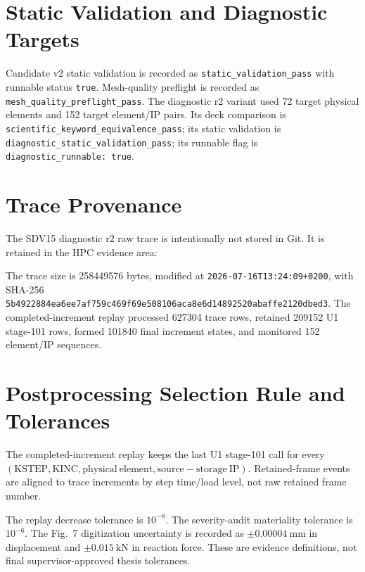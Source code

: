 \section{Static Validation and Diagnostic Targets}

Candidate v2 static validation is recorded as \texttt{static\_validation\_pass}
with runnable status \texttt{true}. Mesh-quality preflight is recorded as
\texttt{mesh\_quality\_preflight\_pass}. The diagnostic r2 variant used
72 target physical elements and 152 target element/IP pairs. Its deck
comparison is \texttt{scientific\_keyword\_equivalence\_pass}; its static
validation is \texttt{diagnostic\_static\_validation\_pass}; its runnable flag
is \texttt{diagnostic\_runnable: true}.

\section{Trace Provenance}

The SDV15 diagnostic r2 raw trace is intentionally not stored in Git. It is
retained in the HPC evidence area:

\begin{quote}
\end{quote}

The trace size is 258449576 bytes, modified at
\texttt{2026-07-16T13:24:09+0200}, with SHA-256
\texttt{5b4922884ea6ee7af759c469f69e508106aca8e6d14892520abaffe2120dbed3}.
The completed-increment replay processed 627304 trace rows, retained 209152 U1
stage-101 rows, formed 101840 final increment states, and monitored 152
element/IP sequences.

\section{Postprocessing Selection Rule and Tolerances}

The completed-increment replay keeps the last U1 stage-101 call for every
\((\mathrm{KSTEP}, \mathrm{KINC}, \mathrm{physical~element},
\mathrm{source-storage~IP})\). Retained-frame events are aligned to trace
increments by step time/load level, not raw retained frame number.

The replay decrease tolerance is \(10^{-8}\). The severity-audit materiality
tolerance is \(10^{-6}\). The Fig.~7 digitization uncertainty is recorded as
\(\pm0.00004~\mathrm{mm}\) in displacement and \(\pm0.015~\mathrm{kN}\) in
reaction force. These are evidence definitions, not final supervisor-approved
thesis tolerances.

